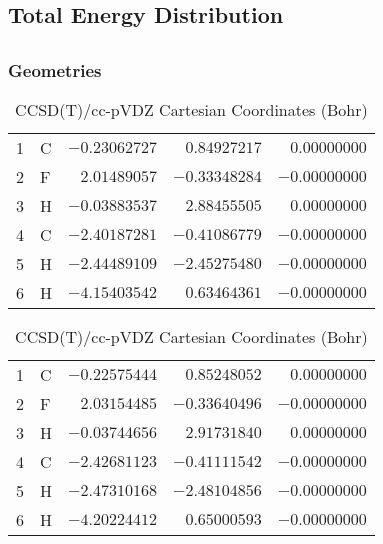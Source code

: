 \documentclass[10pt,oneside]{article}
\begin{document}
\begin{table}
\subsection*{Total Energy Distribution}
\centering\end{table}

\clearpage

\subsection{}

\begin{table}[h!]
\subsubsection*{Geometries}
\begin{multicols}{2}
\centering
\caption{CCSD(T)/cc-pVTZ Cartesian Coordinates (Bohr)}
\begin{tabular}{llrrr}
\toprule
1  & C  & $-0.23062727$ & $ 0.84927217$ & $ 0.00000000$ \\
2  & F  & $ 2.01489057$ & $-0.33348284$ & $-0.00000000$ \\
3  & H  & $-0.03883537$ & $ 2.88455505$ & $ 0.00000000$ \\
4  & C  & $-2.40187281$ & $-0.41086779$ & $-0.00000000$ \\
5  & H  & $-2.44489109$ & $-2.45275480$ & $-0.00000000$ \\
6  & H  & $-4.15403542$ & $ 0.63464361$ & $-0.00000000$ \\
\bottomrule
\end{tabular}
\caption{CCSD(T)/cc-pVDZ Cartesian Coordinates (Bohr)}
\begin{tabular}{llrrr}
\toprule
1  & C  & $-0.22575444$ & $ 0.85248052$ & $ 0.00000000$ \\
2  & F  & $ 2.03154485$ & $-0.33640496$ & $-0.00000000$ \\
3  & H  & $-0.03744656$ & $ 2.91731840$ & $ 0.00000000$ \\
4  & C  & $-2.42681123$ & $-0.41111542$ & $-0.00000000$ \\
5  & H  & $-2.47310168$ & $-2.48104856$ & $-0.00000000$ \\
6  & H  & $-4.20224412$ & $ 0.65000593$ & $-0.00000000$ \\
\bottomrule
\end{tabular}
\end{multicols}
\end{table}
\end{document}
